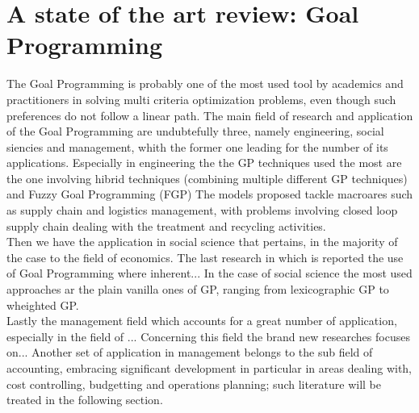 \documentclass{article}
\begin{document}
\pagebreak 

\section{A state of the art review: Goal Programming}
The Goal Programming is probably one of the most used tool by academics and practitioners in solving multi criteria optimization problems, even though such preferences do not follow a linear path\cite{Romero2014}\cite{Schniederjans1995}. The main field of research and application of the Goal Programming are undubtefully three, namely engineering, social siencies and management\cite{colapinto_multi-criteria_2017}, whith the former one leading for the number of its applications.
Especially in engineering the the GP techniques used the most are the one involving hibrid techniques (combining multiple different GP techniques) and Fuzzy Goal Programming (FGP) The models proposed tackle macroares such as supply chain and logistics management, with problems involving closed loop supply chain dealing with the treatment and recycling activities\cite{Inserirezarandi}. 
\\
Then we have the application in social science that pertains, in the majority of the case to the field of economics. The last research in which is reported the use of Goal Programming where inherent... In the case of social science the most used approaches ar the plain vanilla ones of GP, ranging from lexicographic GP to wheighted GP.
\\
Lastly the management field which accounts for a great number of application, especially in the field of ... Concerning this field the brand new researches focuses on... Another set of application in management belongs to the sub field of accounting, embracing significant development in particular in areas dealing with, cost controlling, budgetting and operations planning; such literature will be treated in the following section.
\end{document}

